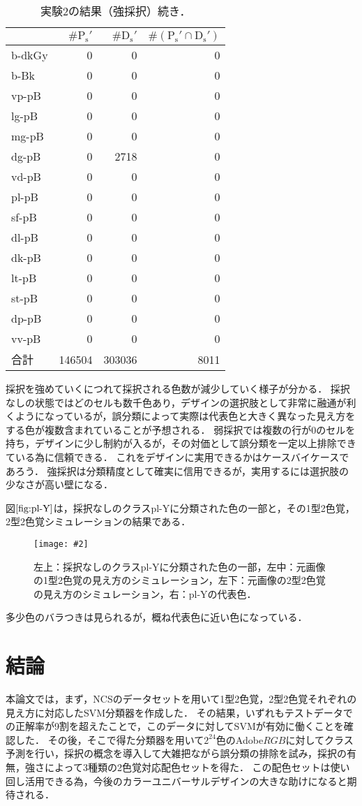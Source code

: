 \documentclass[uplatex,paper=a4,fontsize=4.0truemm,jafontsize=4.0truemm,head_space=30.0truemm,foot_space=30.0truemm,baselineskip=8.0truemm,line_length=40zw,gutter=25.0truemm,oneside,openany,fleqn,hanging_panctuation,open_bracket_pos=nibu_tentsuki,dvipdfmx,jis2004,book,titlepage]{jlreq}
\theoremstyle{mystyle}
\newcommand{\zwspace}{\hspace{1zw}\relax}
\newcommand{\captiondot}[1]{\caption{#1．}}
\newcommand{\figureinput}[4]{\begin{figure}[btp]\centering\texttt{[image: \#2]}\captiondot{#3}\label{fig:#4}\end{figure}}
\newcommand{\tableinput}[4]{\begin{table}[btp]\centering\captiondot{#3}\label{tab:#4}\begin{tabular}{#1}#2\end{tabular}\end{table}}
\newcommand{\mathdisplaystyle}[1]{\(\displaystyle{#1}\)}
\newcommand{\Reference}[1]{\mathdisplaystyle{\ref{#1}}}
\newcommand{\parentheses}[1]{\left(#1\right)}
\begin{document}
				\tableinput{l|rrr}{ & \(\#\textrm{P}_\textrm{s}'\) & \(\#\textrm{D}_\textrm{s}'\) & \(\#\parentheses{\textrm{P}_\textrm{s}'\cap\textrm{D}_\textrm{s}'}\) \\ \hline
					b-dkGy & 0 & 0 & 0 \\
					b-Bk & 0 & 0 & 0 \\
					vp-pB & 0 & 0 & 0 \\
					lg-pB & 0 & 0 & 0 \\
					mg-pB & 0 & 0 & 0 \\
					dg-pB & 0 & 2718 & 0 \\
					vd-pB & 0 & 0 & 0 \\
					pl-pB & 0 & 0 & 0 \\
					sf-pB & 0 & 0 & 0 \\
					dl-pB & 0 & 0 & 0 \\
					dk-pB & 0 & 0 & 0 \\
					lt-pB & 0 & 0 & 0 \\
					st-pB & 0 & 0 & 0 \\
					dp-pB & 0 & 0 & 0 \\
					vv-pB & 0 & 0 & 0 \\ \hline
					合計 & 146504 & 303036 & 8011}{実験2の結果（強採択）\zwspace 続き}{result26}
				\clearpage

				採択を強めていくにつれて採択される色数が減少していく様子が分かる．
				採択なしの状態ではどのセルも数千色あり，デザインの選択肢として非常に融通が利くようになっているが，誤分類によって実際は代表色と大きく異なった見え方をする色が複数含まれていることが予想される．
				弱採択では複数の行が0のセルを持ち，デザインに少し制約が入るが，その対価として誤分類を一定以上排除できている為に信頼できる．
				これをデザインに実用できるかはケースバイケースであろう．
				強採択は分類精度として確実に信用できるが，実用するには選択肢の少なさが高い壁になる．

				図\Reference{fig:pl-Y}は，採択なしのクラスpl-Yに分類された色の一部と，その1型2色覚，2型2色覚シミュレーションの結果である．
				\figureinput{width=7.5truecm}{D:/a/figs/S__54345730.jpg}{左上：採択なしのクラスpl-Yに分類された色の一部，左中：元画像の1型2色覚の見え方のシミュレーション，左下：元画像の2型2色覚の見え方のシミュレーション，右：pl-Yの代表色}{pl-Y}
				多少色のバラつきは見られるが，概ね代表色に近い色になっている．
	\chapter{結論}
		本論文では，まず，NCSのデータセットを用いて1型2色覚，2型2色覚それぞれの見え方に対応したSVM分類器を作成した．
		その結果，いずれもテストデータでの正解率が9割を超えたことで，このデータに対してSVMが有効に働くことを確認した．
		その後，そこで得た分類器を用いて\mathdisplaystyle{2^{24}}色のAdobe\mathdisplaystyle{RGB}に対してクラス予測を行い，採択の概念を導入して大雑把ながら誤分類の排除を試み，採択の有無，強さによって3種類の2色覚対応配色セットを得た．
		この配色セットは使い回し活用できる為，今後のカラーユニバーサルデザインの大きな助けになると期待される．
\end{document}
